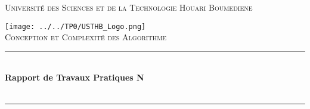 

\begin{titlepage} %
	\newcommand{\HRule}{\rule{\linewidth}{0.5mm}} %
	
	\center %
	
	
	\baselineskip 
	\textsc{\LARGE Université des Sciences et de la Technologie Houari Boumediene}%

	
	\vfill
	\texttt{[image: ../../TP0/USTHB\_Logo.png]}\\[1cm] %
	 
	
	\textsc{\Large Conception et Complexité des Algorithme}\\[0.5cm] %
	
	
	\HRule\\[0.4cm]
	\baselineskip 
	{\huge\bfseries Rapport de Travaux Pratiques N\textdegree  \reportnumber \\ \reporttitle}\\[0.4cm] %
	
	\HRule\\[1.5cm]
	
	

\end{titlepage}
